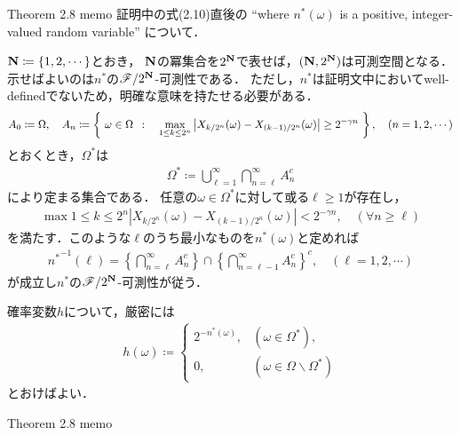 	\begin{itembox}[l]{Theorem 2.8 memo}
		証明中の式(2.10)直後の
		``where $n^*(\omega)$ is a positive, integer-valued random variable''
		について．
	\end{itembox}
	
	\begin{prf}
		$\mathbf{N} \coloneqq \{1,2,\cdots\}$とおき，
		$\mathbf{N}$の冪集合を$2^{\mathbf{N}}$で表せば，$(\mathbf{N},2^{\mathbf{N}})$は可測空間となる．
		示せばよいのは$n^*$の$\mathscr{F}/2^{\mathbf{N}}$-可測性である．
		ただし，$n^*$は証明文中においてwell-definedでないため，明確な意味を持たせる必要がある．
		\begin{align}
			A_0 \coloneqq \Omega,
			\quad A_n \coloneqq \left\{\ \omega \in \Omega\ \, : \quad \operatorname*{max}_{1 \leq k \leq 2^n} \left| X_{k/2^n}(\omega) - X_{(k-1)/2^n}(\omega) \right| \geq 2^{-\gamma n}\ \right\},
			\quad (n=1,2,\cdots)
		\end{align}
		とおくとき，$\Omega^*$は
		\begin{align}
			\Omega^* \coloneqq \bigcup_{\ell =1}^{\infty} \bigcap_{n = \ell}^\infty A_n^c
		\end{align}
		により定まる集合である．
		任意の$\omega \in \Omega^*$に対して或る$\ell \geq 1$が存在し，
		\begin{align}
			\max{1 \leq k \leq 2^n}{\left| X_{k/2^n}(\omega) - X_{(k-1)/2^n}(\omega) \right|} < 2^{-\gamma n},
			\quad (\forall n \geq \ell)
		\end{align}
		を満たす．このような$\ell$のうち最小なものを$n^*(\omega)$と定めれば
		\begin{align}
			{n^*}^{-1}(\ell) = \left\{ \bigcap_{n = \ell}^\infty A_n^c \right\} \cap \left\{ \bigcap_{n = \ell-1}^\infty A_n^c \right\}^c,
			\quad (\ell =1,2,\cdots)
		\end{align}
		が成立し$n^*$の$\mathscr{F}/2^{\mathbf{N}}$-可測性が従う．
		\QED
	\end{prf}
	
	確率変数$h$について，厳密には
	\begin{align}
		h(\omega) \coloneqq 
		\begin{cases}
			2^{-n^*(\omega)}, & (\omega \in \Omega^*), \\
			0, & (\omega \in \Omega \backslash \Omega^*)
		\end{cases}
	\end{align}
	とおけばよい．
	
	\begin{itembox}[l]{Theorem 2.8 memo}
	\end{itembox}